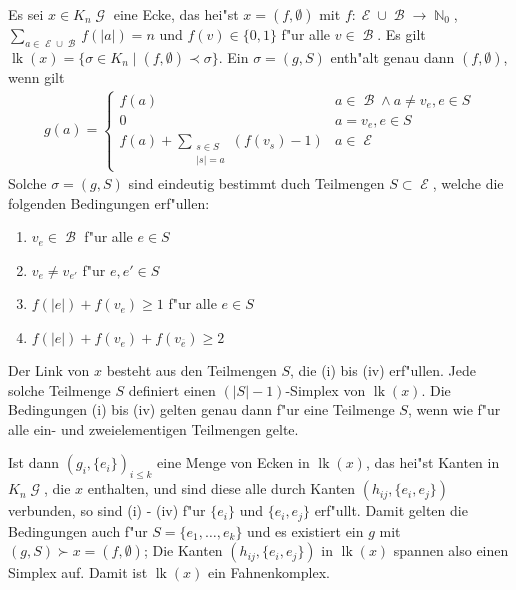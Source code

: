 \documentclass[paper=A4, twoside, chapterprefix=true, bibliography=totoc, headsepline]{scrbook}
\DeclareMathOperator{\N}{\mathbb{N}}
\DeclareMathOperator{\calB}{{\mathcal{B}}}
\DeclareMathOperator{\calE}{{\mathcal{E}}}
\DeclareMathOperator{\calG}{{\mathcal{G}}}
\newcommand{\E}{\calE}
\newcommand{\G}{\calG}
\DeclareMathOperator{\lk}{lk} %
\theoremstyle{break}
\theoremstyle{nonumberbreak}
\theoremstyle{emptybreak}
\theoremstyle{break}
\begin{document}
Es sei $x \in K_n\G$ eine Ecke, das hei"st $x = (f, \emptyset)$ mit $f: \E \cup \calB \to \N_0$, $\sum_{a \in \E \cup \calB} f(|a|) = n$ und $f(v) \in \{0, 1\}$ f"ur alle $v \in \calB$.
Es gilt $\lk(x) = \{ \sigma \in K_n \mid (f, \emptyset) \prec \sigma \}$.
Ein $\sigma = (g, S)$ enth"alt genau dann $(f, \emptyset)$, wenn gilt
\begin{align*}
	g(a) = \begin{cases}
		f(a) & a \in \calB \wedge a \ne v_e, e \in S \\
		0 & a = v_e, e \in S \\
		f(a) + \sum_{\substack{s \in S \\ |s| = a}} (f(v_s) - 1) & a \in \E
	\end{cases}
\end{align*}
Solche $\sigma = (g, S)$ sind eindeutig bestimmt duch Teilmengen $S \subset \E$, welche die folgenden Bedingungen erf"ullen:
\begin{enumerate}[label=(\roman*)]
\item
	$v_e \in \calB$ f"ur alle $e \in S$
\item
	$v_e \ne v_{e'}$ f"ur $e, e' \in S$
\item
	$f(|e|) + f(v_e) \ge 1$ f"ur alle $e \in S$
\item
	$f(|e|) + f(v_e) + f(v_{\overline{e}}) \ge 2$
\end{enumerate}
Der Link von $x$ besteht aus den Teilmengen $S$, die (i) bis (iv) erf"ullen.
Jede solche Teilmenge $S$ definiert einen $(|S| - 1)$-Simplex von $\lk(x)$.
Die Bedingungen (i) bis (iv) gelten genau dann f"ur eine Teilmenge $S$, wenn wie f"ur alle ein- und zweielementigen Teilmengen gelte.

Ist dann $(g_i, \{e_i\})_{i \le k}$ eine Menge von Ecken in $\lk(x)$, das hei"st Kanten in $K_n\G$, die $x$ enthalten, und sind diese alle durch Kanten $(h_{ij}, \{e_i, e_j\})$ verbunden, so sind (i) - (iv) f"ur $\{e_i\}$ und $\{e_i, e_j\}$ erf"ullt.
Damit gelten die Bedingungen auch f"ur $S = \{e_1, \ldots, e_k\}$ und es existiert ein $g$ mit $(g, S) \succ x = (f, \emptyset)$; Die Kanten $(h_{ij}, \{e_i, e_j\})$ in $\lk(x)$ spannen also einen Simplex auf.
Damit ist $\lk(x)$ ein Fahnenkomplex.
\end{document}
